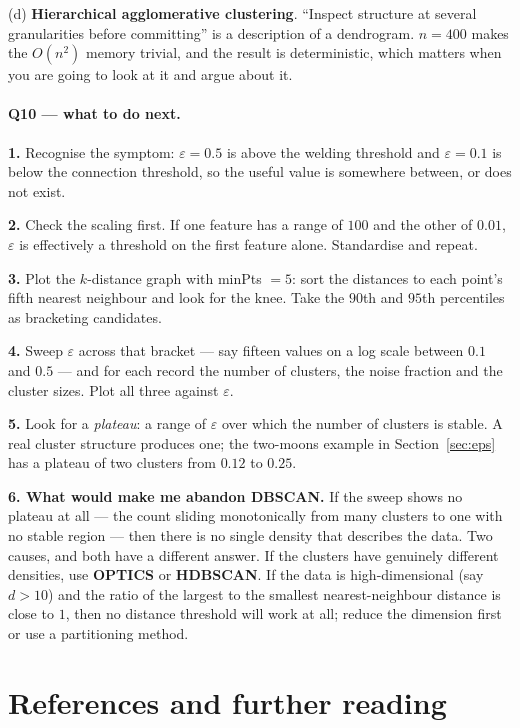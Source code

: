 \documentclass[11pt]{article}
\begin{document}
(d) \textbf{Hierarchical agglomerative clustering}. ``Inspect structure at
several granularities before committing'' is a description of a dendrogram.
$n = 400$ makes the $O(n^2)$ memory trivial, and the result is deterministic,
which matters when you are going to look at it and argue about it.

\paragraph{Q10 --- what to do next.}
\textbf{1.} Recognise the symptom: $\varepsilon = 0.5$ is above the welding
threshold and $\varepsilon = 0.1$ is below the connection threshold, so the
useful value is somewhere between, or does not exist.

\textbf{2.} Check the scaling first. If one feature has a range of $100$ and
the other of $0.01$, $\varepsilon$ is effectively a threshold on the first
feature alone. Standardise and repeat.

\textbf{3.} Plot the $k$-distance graph with minPts $= 5$: sort the distances
to each point's fifth nearest neighbour and look for the knee. Take the
$90$th and $95$th percentiles as bracketing candidates.

\textbf{4.} Sweep $\varepsilon$ across that bracket --- say fifteen values on
a log scale between $0.1$ and $0.5$ --- and for each record the number of
clusters, the noise fraction and the cluster sizes. Plot all three against
$\varepsilon$.

\textbf{5.} Look for a \emph{plateau}: a range of $\varepsilon$ over which
the number of clusters is stable. A real cluster structure produces one; the
two-moons example in Section~\ref{sec:eps} has a plateau of two clusters from
$0.12$ to $0.25$.

\textbf{6. What would make me abandon DBSCAN.} If the sweep shows no plateau
at all --- the count sliding monotonically from many clusters to one with no
stable region --- then there is no single density that describes the data.
Two causes, and both have a different answer. If the clusters have genuinely
different densities, use \textbf{OPTICS} or \textbf{HDBSCAN}. If the data is
high-dimensional (say $d > 10$) and the ratio of the largest to the smallest
nearest-neighbour distance is close to $1$, then no distance threshold will
work at all; reduce the dimension first or use a partitioning method.

\section{References and further reading}
\label{sec:refs}
\end{document}
